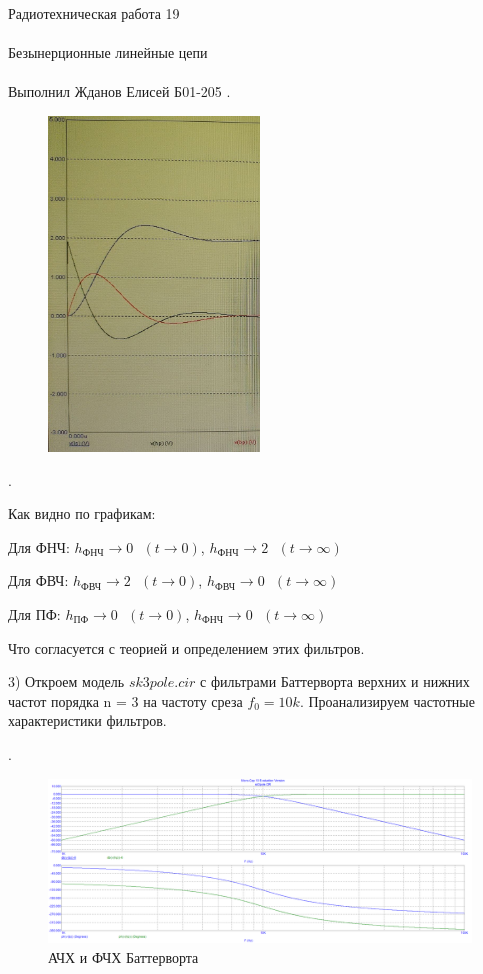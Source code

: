 \documentclass{astroedu-lab}
\begin{document}
\begin{problem}{\huge Радиотехническая работа 19\\\\Безынерционные линейные цепи\\\\Выполнил Жданов Елисей Б01-205}
.
\begin{figure}[!h]
	\centering
	\includegraphics[width=0.5\textwidth]{gr1.jpg}
	\label{fig:boiler}
\end{figure}

.

Как видно по графикам:

Для ФНЧ: $h_\text{ФНЧ} \rightarrow 0 \text{ } (t \rightarrow 0)$, $h_\text{ФНЧ} \rightarrow 2 \text{ } (t \rightarrow \infty)$

Для ФВЧ: $h_\text{ФВЧ} \rightarrow 2 \text{ } (t \rightarrow 0)$, $h_\text{ФВЧ} \rightarrow 0 \text{ } (t \rightarrow \infty)$

Для ПФ: $h_\text{ПФ} \rightarrow 0 \text{ } (t \rightarrow 0)$, $h_\text{ФНЧ} \rightarrow 0 \text{ } (t \rightarrow \infty)$

Что согласуется с теорией и определением этих фильтров.

\newpage

3) Откроем модель $\textit{sk3pole.cir}$ с фильтрами Баттерворта верхних и нижних частот порядка n = 3 на частоту среза $f_0 = 10k$. Проанализируем частотные характеристики фильтров.

.
\begin{figure}[!h]
	\centering
	\includegraphics[width=1.0\textwidth]{batt1.png}
	\caption{АЧХ и ФЧХ Баттерворта}
	\label{fig:boiler}
\end{figure}


\end{problem}
\end{document}
